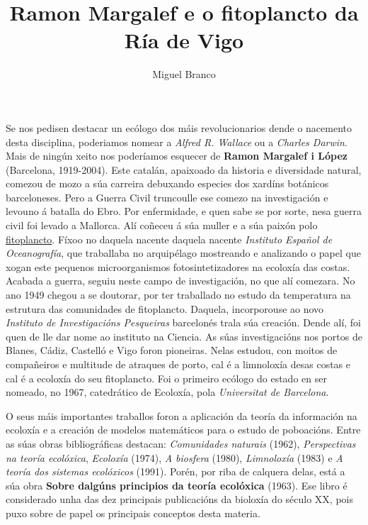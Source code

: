 \documentclass{article}
\begin{document}
\title{Ramon Margalef e o fitoplancto da Ría de Vigo}
\author{Miguel Branco}
\date{}
\maketitle


Se nos pedisen destacar un ecólogo dos máis revolucionarios dende o nacemento desta disciplina, poderiamos nomear a \textit{Alfred R. Wallace} ou a \textit{Charles Darwin}. Mais de ningún xeito nos poderíamos esquecer de \textbf{Ramon Margalef i López} (Barcelona, 1919-2004). Este catalán, apaixoado da historia e diversidade natural, comezou de mozo a súa carreira debuxando especies dos xardíns botánicos barceloneses. Pero a Guerra Civil truncoulle ese comezo na investigación e levouno á batalla do Ebro. Por enfermidade, e quen sabe se por sorte, nesa guerra civil foi levado a Mallorca. Alí coñeceu á súa muller e a súa paixón polo \href{https://gl.wikipedia.org/wiki/Fitoplancto}{fitoplancto}. Fíxoo no daquela nacente daquela nacente \textit{Instituto Español de Oceanografía}, que traballaba no arquipélago mostreando e analizando o papel que xogan este pequenos microorganismos fotosintetizadores na ecoloxía das costas. Acabada a guerra, seguiu neste campo de investigación, no que alí comezara. No ano 1949 chegou a se doutorar, por ter traballado no estudo da temperatura na estrutura das comunidades de fitoplancto. Daquela, incorporouse ao novo \textit{Instituto de Investigacións Pesqueiras} barcelonés trala súa creación. Dende alí, foi quen de lle dar nome ao instituto na Ciencia. As súas investigacións nos portos de Blanes, Cádiz, Castelló e Vigo foron pioneiras. Nelas estudou, con moitos de compañeiros e multitude de atraques de porto, cal é a limnoloxía desas costas e cal é a ecoloxía do seu fitoplancto. Foi o primeiro ecólogo do estado en ser nomeado, no 1967, catedrático de Ecoloxía, pola \textit{Universitat de Barcelona}.


O seus máis importantes traballos foron a aplicación da teoría da información na ecoloxía e a creación de modelos matemáticos para o estudo de poboacións. Entre as súas obras bibliográficas destacan: \textit{Comunidades naturais} (1962), \textit{Perspectivas na teoría ecolóxica}, \textit{Ecoloxía} (1974), \textit{A biosfera} (1980), \textit{Limnoloxía} (1983) e \textit{A teoría dos sistemas ecolóxicos} (1991). Porén, por riba de calquera delas, está a súa obra \textbf{Sobre dalgúns principios da teoría ecolóxica} (1963). Ese libro é considerado unha das dez principais publicacións da bioloxía do século XX, pois puxo sobre de papel os principais conceptos desta materia.
\end{document}
